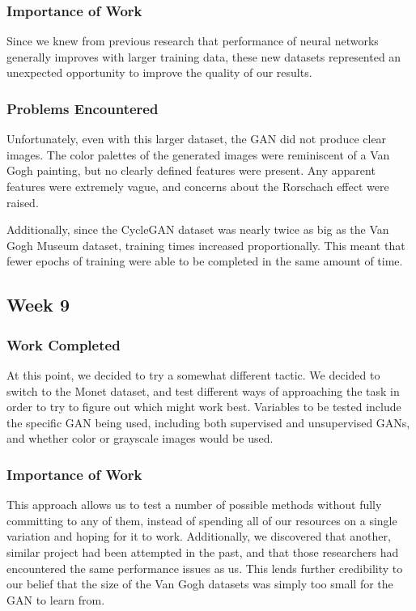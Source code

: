 \documentclass[12pt,letterpaper]{article}
\begin{document}
			\subsubsection{Importance of Work}
				Since we knew from previous research that performance of neural networks generally improves with larger training data, these new datasets represented an unexpected opportunity to improve the quality of our results.
			\subsubsection{Problems Encountered}
				Unfortunately, even with this larger dataset, the GAN did not produce clear images.
				The color palettes of the generated images were reminiscent of a Van Gogh painting, but no clearly defined features were present.
				Any apparent features were extremely vague, and concerns about the Rorschach effect were raised.

				Additionally, since the CycleGAN dataset was nearly twice as big as the Van Gogh Museum dataset, training times increased proportionally.
				This meant that fewer epochs of training were able to be completed in the same amount of time.

		\subsection{Week 9}
			\subsubsection{Work Completed}
				At this point, we decided to try a somewhat different tactic.
				We decided to switch to the Monet dataset, and test different ways of approaching the task in order to try to figure out which might work best.
				Variables to be tested include the specific GAN being used, including both supervised and unsupervised GANs, and whether color or grayscale images would be used.
			\subsubsection{Importance of Work}
				This approach allows us to test a number of possible methods without fully committing to any of them, instead of spending all of our resources on a single variation and hoping for it to work.
				Additionally, we discovered that another, similar project had been attempted in the past\cite{otherGanGogh}, and that those researchers had encountered the same performance issues as us.
				This lends further credibility to our belief that the size of the Van Gogh datasets was simply too small for the GAN to learn from.
\end{document}
